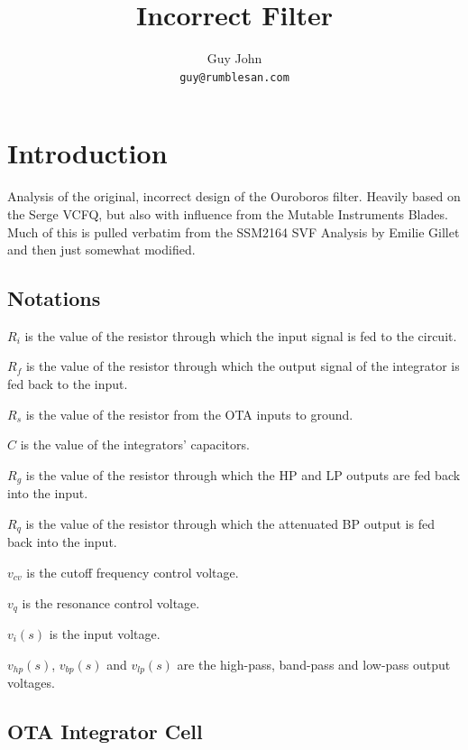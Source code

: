 \documentclass{article}
\title{Incorrect Filter}
\author{Guy John \\ \texttt{guy@rumblesan.com}}
\begin{document}
\maketitle

\section{Introduction}
Analysis of the original, incorrect design of the Ouroboros filter. Heavily based on the Serge VCFQ, but also with influence from the Mutable Instruments Blades. Much of this is pulled verbatim from the SSM2164 SVF Analysis by Emilie Gillet and then just somewhat modified.

\newpage

\subsection{Notations}

\begin{description}
\item $R_i$ is the value of the resistor through which the input signal is fed to the circuit.
\item $R_f$ is the value of the resistor through which the output signal of the integrator is fed back to the input.
\item $R_s$ is the value of the resistor from the OTA inputs to ground.
\item $C$ is the value of the integrators' capacitors.
\item $R_g$ is the value of the resistor through which the HP and LP outputs are fed back into the input.
\item $R_q$ is the value of the resistor through which the attenuated BP output is fed back into the input.
\item $v_{cv}$ is the cutoff frequency control voltage.
\item $v_q$ is the resonance control voltage.
\item $v_i(s)$ is the input voltage.
\item $v_{hp}(s)$, $v_{bp}(s)$ and $v_{lp}(s)$ are the high-pass, band-pass and low-pass output voltages.
\end{description}

\subsection{OTA Integrator Cell}
\end{document}

